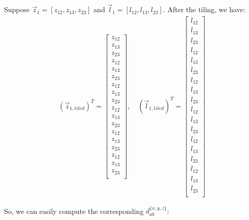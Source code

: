 Suppose $\vec{z}_{1} = [z_{12}, z_{13}, z_{23}]$ and 
$\vec{l}_{1} = [l_{12}, l_{13}, l_{23}]$. After the tiling, we have:
\begin{eqnarray}
\left(\vec{z}_{1, tiled}\right)^T = \left[
	\begin{array}{c}
		z_{12} \\
		z_{13} \\
		z_{23} \\
		z_{12} \\
		z_{13} \\
		z_{23} \\
		z_{12} \\
		z_{13} \\
		z_{23} \\
		z_{12} \\
		z_{13} \\
		z_{23} \\
		z_{12} \\
		z_{13} \\
		z_{23} \\
		z_{12} \\
		z_{13} \\
		z_{23} \\
	\end{array}
\right]
, \quad
\left(\vec{l}_{1, tiled}\right)^T = \left[
	\begin{array}{c}
		l_{12} \\
		l_{13} \\
		l_{23} \\
		l_{12} \\
		l_{13} \\
		l_{23} \\
		l_{12} \\
		l_{13} \\
		l_{23} \\
		l_{12} \\
		l_{13} \\
		l_{23} \\
		l_{12} \\
		l_{13} \\
		l_{23} \\
		l_{12} \\
		l_{13} \\
		l_{23} \\
	\end{array}
\right]
\end{eqnarray}

\noindent So, we can easily compute the corresponding $d^{\{ x,y,z \}}_{ab}$:

